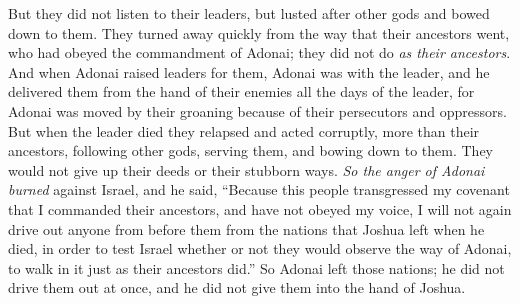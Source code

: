 \begin{biblechapter}
\verse But they did not listen to their leaders, but lusted after other gods and bowed down to them. They turned away quickly from the way that their ancestors went, who had obeyed the commandment of Adonai; they did not do \textit{as their ancestors}.
\verse And when Adonai raised leaders for them, Adonai was with the leader, and he delivered them from the hand of their enemies all the days of the leader, for Adonai was moved by their groaning because of their persecutors and oppressors.
\verse But when the leader died they relapsed and acted corruptly, more than their ancestors, following other gods, serving them, and bowing down to them. They would not give up their deeds or their stubborn ways.
\verse \textit{So the anger of Adonai burned} against Israel, and he said, “Because this people transgressed my covenant that I commanded their ancestors, and have not obeyed my voice,
\verse I will not again drive out anyone from before them from the nations that Joshua left when he died,
\verse in order to test Israel whether or not they would observe the way of Adonai, to walk in it just as their ancestors did.”
\verse So Adonai left those nations; he did not drive them out at once, and he did not give them into the hand of Joshua.
\end{biblechapter}

